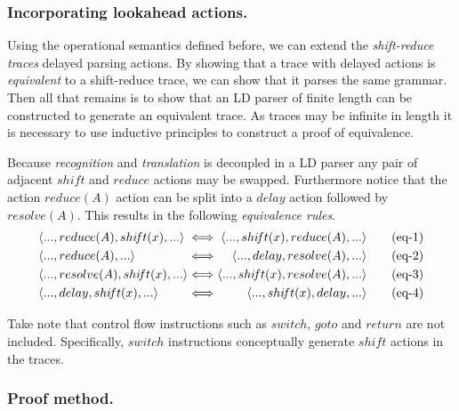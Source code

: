 \documentclass[A4]{sig-alternate}
\begin{document}
\subsubsection{Incorporating lookahead actions.}

Using the operational semantics defined before, we can extend the \emph{shift-reduce traces} delayed parsing actions.
By showing that a trace with delayed actions is \emph{equivalent} to a shift-reduce trace, we can show that it parses the same grammar.
Then all that remains is to show that an LD parser of finite length can be constructed to generate an equivalent trace.
As traces may be infinite in length it is necessary to use inductive principles to construct a proof of equivalence.

Because \emph{recognition} and \emph{translation} is decoupled in a LD parser any pair of adjacent $shi\!ft$ and $reduce$ actions may be swapped.
Furthermore notice that the action $reduce(A)$ action can be split into a $delay$ action followed by $resolve(A)$.
This results in the following \emph{equivalence rules}.
{\small
\begin{align*}
&\langle ..., reduce(A), shi\!ft(x), ... \rangle  &\hspace{-1em}\iff&& \hspace{-1em}\langle ..., shi\!ft(x), reduce(A), ... \rangle  \tag{eq-1}\\
&\langle ..., reduce(A), ... \rangle              &\hspace{-1em}\iff&& \hspace{-1em}\langle ..., delay, resolve(A), ... \rangle      \tag{eq-2}\\
&\langle ..., resolve(A), shi\!ft(x), ... \rangle &\hspace{-1em}\iff&& \hspace{-1em}\langle ..., shi\!ft(x), resolve(A), ... \rangle \tag{eq-3}\\
&\langle ..., delay, shi\!ft(x), ... \rangle      &\hspace{-1em}\iff&& \hspace{-1em}\langle ..., shi\!ft(x), delay, ... \rangle      \tag{eq-4}
\end{align*}}

Take note that control flow instructions such as $switch$, $goto$ and $return$ are not included.
Specifically, $switch$ instructions conceptually generate $shi\!ft$ actions in the traces.

\subsubsection{Proof method.}
\end{document}
